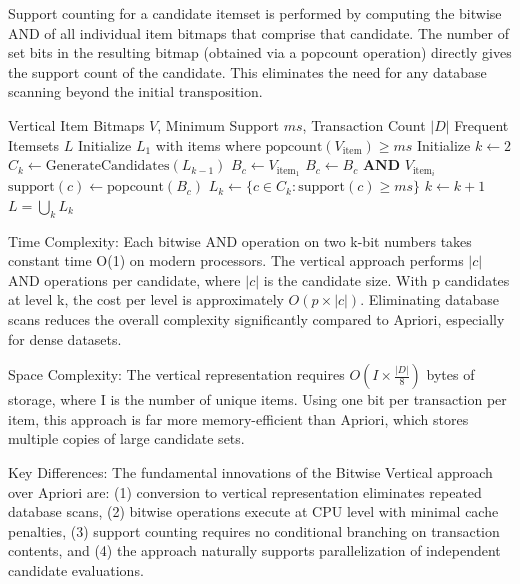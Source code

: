 \documentclass[conference]{IEEEtran}
\begin{document}
Support counting for a candidate itemset is performed by computing the bitwise AND of all individual item bitmaps that comprise that candidate. The number of set bits in the resulting bitmap (obtained via a popcount operation) directly gives the support count of the candidate. This eliminates the need for any database scanning beyond the initial transposition.

\begin{algorithm}
\caption{Bitwise Vertical FIM Algorithm}
\begin{algorithmic}[1]
\REQUIRE Vertical Item Bitmaps $V$, Minimum Support $ms$, Transaction Count $|D|$
\ENSURE Frequent Itemsets $L$
\STATE Initialize $L_1$ with items where $\text{popcount}(V_{\text{item}}) \geq ms$
\STATE Initialize $k \gets 2$
    \STATE $C_k \gets \text{GenerateCandidates}(L_{k-1})$
        \STATE $B_c \gets V_{\text{item}_1}$
            \STATE $B_c \gets B_c \textbf{ AND } V_{\text{item}_i}$
        \ENDFOR
        \STATE $\text{support}(c) \gets \text{popcount}(B_c)$
    \ENDFOR
    \STATE $L_k \gets \{c \in C_k : \text{support}(c) \geq ms\}$
    \STATE $k \gets k + 1$
\ENDWHILE
\RETURN $L = \bigcup_k L_k$
\end{algorithmic}
\end{algorithm}

Time Complexity: Each bitwise AND operation on two k-bit numbers takes constant time O(1) on modern processors. The vertical approach performs $|c|$ AND operations per candidate, where $|c|$ is the candidate size. With p candidates at level k, the cost per level is approximately $O(p \times |c|)$. Eliminating database scans reduces the overall complexity significantly compared to Apriori, especially for dense datasets.

Space Complexity: The vertical representation requires $O(I \times \frac{|D|}{8})$ bytes of storage, where I is the number of unique items. Using one bit per transaction per item, this approach is far more memory-efficient than Apriori, which stores multiple copies of large candidate sets.

Key Differences: The fundamental innovations of the Bitwise Vertical approach over Apriori are: (1) conversion to vertical representation eliminates repeated database scans, (2) bitwise operations execute at CPU level with minimal cache penalties, (3) support counting requires no conditional branching on transaction contents, and (4) the approach naturally supports parallelization of independent candidate evaluations.
\end{document}
